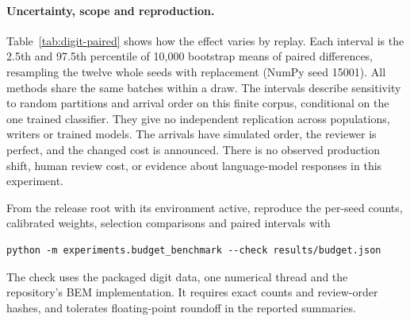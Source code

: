 \paragraph{Uncertainty, scope and reproduction.}
Table~\ref{tab:digit-paired} shows how the effect varies by replay.
Each interval is the 2.5th and 97.5th percentile of 10,000 bootstrap means
of paired differences, resampling the twelve whole seeds with replacement
(NumPy seed 15001). All methods share the same batches within a draw.
The intervals describe sensitivity to random partitions and arrival order
on this finite corpus, conditional on the one trained classifier. They give
no independent replication across populations, writers or trained models.
The arrivals have simulated order, the reviewer is perfect, and the changed
cost is announced. There is no observed production shift, human review cost,
or evidence about language-model responses in this experiment.

From the release root with its environment active, reproduce the per-seed
counts, calibrated weights, selection comparisons and paired intervals with
\begin{verbatim}
python -m experiments.budget_benchmark --check results/budget.json
\end{verbatim}
The check uses the packaged digit data, one numerical thread and the
repository's BEM implementation. It requires exact counts and review-order
hashes, and tolerates floating-point roundoff in the reported summaries.
